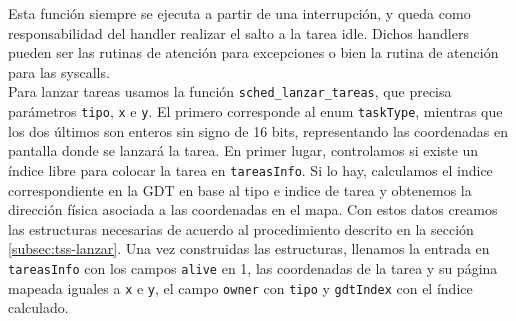 Esta función siempre se ejecuta a partir de una interrupción, y queda como responsabilidad del handler realizar el salto a la tarea idle. Dichos handlers pueden ser las rutinas de atención para excepciones o bien la rutina de atención para las syscalls.\\



Para lanzar tareas usamos la función \verb|sched_lanzar_tareas|, que precisa parámetros \verb|tipo|, \verb|x| e \verb|y|. El primero corresponde al enum \verb|taskType|, mientras que los dos últimos son enteros sin signo de 16 bits, representando las coordenadas en pantalla donde se lanzará la tarea.
En primer lugar, controlamos si existe un índice libre para colocar la tarea en \verb|tareasInfo|. Si lo hay, calculamos el indice correspondiente en la GDT en base al tipo e indice de tarea y obtenemos la dirección física asociada a las coordenadas en el mapa. Con estos datos creamos las estructuras necesarias de acuerdo al procedimiento descrito en la sección \ref{subsec:tss-lanzar}.
Una vez construidas las estructuras, llenamos la entrada en \verb|tareasInfo| con los campos
\verb|alive| en 1, las coordenadas de la tarea y su página mapeada iguales a \verb|x| e \verb|y|, el campo \verb|owner| con \verb|tipo| y \verb|gdtIndex| con el índice calculado.






\begin{comment}
4.7.
Ejercicio 7

a) Construir una función para inicializar las estructuras de datos del scheduler.


b) Crear la función sched proximo indice() que devuelve el ındice en la GDT de la próxima
tarea a ser ejecutada. Construir la rutina de forma devuelva una tarea de cada jugador
por vez según se explica en la sección 3.2

c) Modificar la rutina de la interrupción 0x66, para que implemente los tres servicios según
se indica en la sección 3.1.1.


d) Modificar el código necesario para que se realice el intercambio de tareas por cada ciclo de
reloj. El intercambio se realizará según indique la función sched proximo indice().


e) Modificar las rutinas de excepciones del procesador para que desalojen y destruyan a la
tarea que estaba corriendo y corran la próxima.


f) Implementar el mecanismo de debugging explicado en la sección 3.4 que indicará en pan-
talla la razón del desalojo de una tarea.


Nota: Se recomienda construir funciones en C que ayuden a resolver problemas como
convertir direcciones de el mapa a direcciones fısicas o buscar la proxima tarea a ejecutar.

\end{comment}


\label{sec-desalojo}

